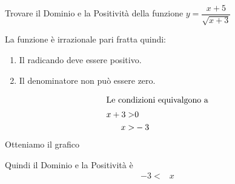 		Trovare il Dominio e la Positività della funzione $y=\dfrac{x+5}{\sqrt{x+3}}$%
	
	La funzione è irrazionale pari fratta quindi:
	\begin{enumerate}
		\item Il radicando deve essere positivo.
		\item Il denominatore non può essere zero.
	\end{enumerate}
	\begin{align*}
	\intertext{Le condizioni equivalgono a}
	x+3>&0\\
	x>&-3
	\end{align*}
	Otteniamo il grafico
	\begin{center}
		
	\end{center}
	Quindi il Dominio e la Positività è
	\begin{align*}
	-3<& x
	\end{align*}
	
